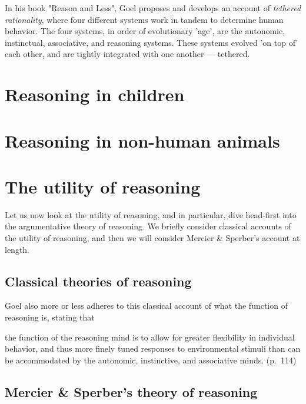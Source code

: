 In his book "Reason and Less", Goel proposes and develops an account of \emph{tethered rationality}, where four different systems work in tandem to determine human behavior. The four systems, in order of evolutionary 'age', are the autonomic, instinctual, associative, and reasoning systems. These systems evolved 'on top of' each other, and are tightly integrated with one another --- tethered.

\section{Reasoning in children}

\section{Reasoning in non-human animals}

\section{The utility of reasoning}

Let us now look at the utility of reasoning, and in particular, dive head-first into the argumentative theory of reasoning.
We briefly consider classical accounts of the utility of reasoning, and then we will consider Mercier \& Sperber's account at length.

\subsection{Classical theories of reasoning}

Goel also more or less adheres to this classical account of what the function of reasoning is, stating that
\begin{quoting}
    the function of the reasoning mind is to allow for greater flexibility in individual behavior, and thus more finely tuned responses to environmental stimuli than can be accommodated by the autonomic, instinctive, and associative minds.
    \hfill (p.~114)
\end{quoting}

\subsection{Mercier \& Sperber's theory of reasoning}


